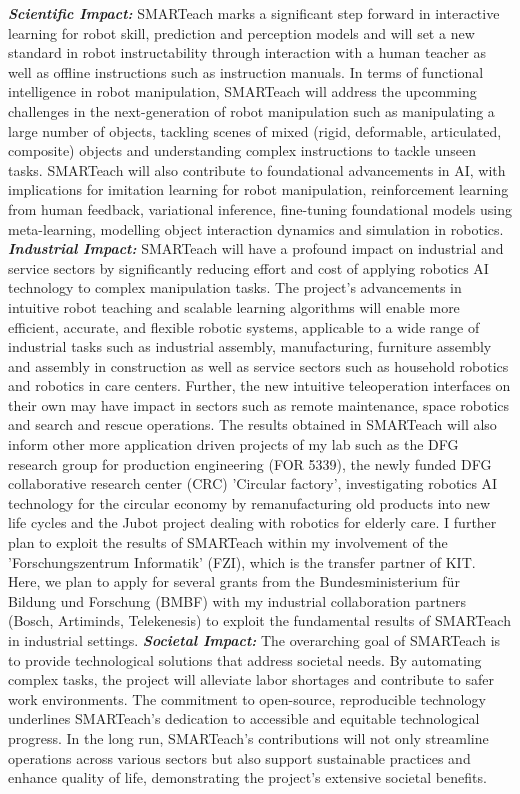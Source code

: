 \documentclass{erc-B2}
\begin{document}
\textbf{\textit{Scientific Impact:}} SMARTeach marks a significant step forward in interactive  learning for robot skill, prediction and perception models and will set a new standard in robot instructability through interaction with a human teacher as well as  offline instructions such as instruction manuals. In terms of functional intelligence in robot manipulation, SMARTeach will address the upcomming challenges in the next-generation of robot manipulation such as manipulating a large number of objects, tackling scenes of mixed (rigid, deformable, articulated, composite) objects and understanding complex instructions to tackle unseen tasks. SMARTeach will also contribute to foundational advancements in AI, with implications for imitation learning for robot manipulation, reinforcement learning from human feedback, variational inference, fine-tuning foundational models using meta-learning, modelling object interaction dynamics and simulation in robotics. 
\newline
\textbf{\textit{Industrial Impact:}} SMARTeach will have a profound impact on industrial and service  sectors by significantly reducing effort and cost of applying robotics AI technology to complex manipulation tasks. The project's advancements in intuitive robot teaching and scalable learning algorithms will enable more efficient, accurate, and flexible robotic systems, applicable to a wide range of industrial tasks such as industrial assembly, manufacturing, furniture assembly and assembly in construction as well as service sectors such as household robotics and robotics in care centers. Further, the new intuitive teleoperation interfaces on their own may have impact in sectors such as remote maintenance, space robotics and search and rescue operations. 
The results obtained in SMARTeach will also inform other more application driven projects of my lab such as the DFG research group for production engineering (FOR 5339), the newly funded DFG collaborative research center (CRC) 'Circular factory', investigating robotics AI technology for the circular economy by remanufacturing old products into new life cycles and the Jubot project dealing with robotics for elderly care. I further plan to exploit the results of SMARTeach within  my involvement of the 'Forschungszentrum Informatik' (FZI), which is the transfer partner of KIT. Here, we plan to apply for several grants from the Bundesministerium für Bildung und Forschung (BMBF) with my industrial collaboration partners (Bosch, Artiminds, Telekenesis) to exploit the fundamental results of SMARTeach in industrial settings. \newline
\textbf{\textit{Societal Impact:}} The overarching goal of SMARTeach is to provide technological solutions that address societal needs. By automating complex tasks, the project will alleviate labor shortages and contribute to safer work environments. The commitment to open-source, reproducible technology underlines SMARTeach’s dedication to accessible and equitable technological progress. In the long run, SMARTeach's contributions will not only streamline operations across various sectors but also support sustainable practices and enhance quality of life, demonstrating the project’s extensive societal benefits. 

\label{sec:resources}


\pagebreak
\bigskip
\printbibliography[prenote=bolditalics]
\end{document}
